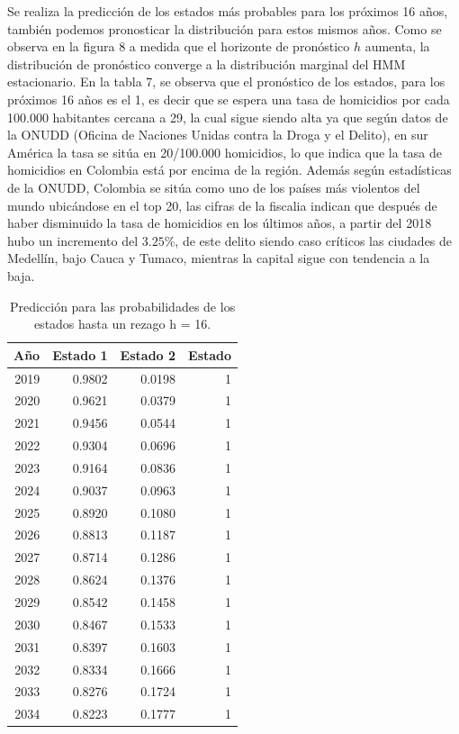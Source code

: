 \documentclass[a4paper]{article}\usepackage[]{graphicx}\usepackage[]{color}
\begin{document}
Se realiza la predicción de los estados más probables para los próximos 16 años, también podemos pronosticar la distribución para estos mismos años. Como se observa en la figura 8 a medida que el horizonte de pronóstico $h$ aumenta, la distribución de pronóstico converge a la distribución marginal del HMM estacionario. En la tabla 7, se observa que el pronóstico de los estados, para los próximos 16 años es el 1, es decir que se espera una tasa de homicidios por cada 100.000 habitantes cercana a 29, la cual sigue siendo alta ya que según datos de la ONUDD (Oficina de Naciones Unidas contra la Droga y el Delito), en sur América la tasa se sitúa en 20/100.000 homicidios, lo que indica que la tasa de homicidios en  Colombia está por encima de la región. Además según estadísticas de la ONUDD, Colombia se sitúa como uno de los países más violentos del mundo ubicándose en el top 20, las cifras de la fiscalia indican que después de haber disminuido la tasa de homicidios en los últimos años, a partir del 2018 hubo un incremento del $3.25 \%$, de este delito siendo caso críticos las ciudades de Medellín, bajo Cauca y Tumaco, mientras la capital sigue con tendencia a la baja.

\begin{table}[ht]
\centering
\begin{tabular}{rrrr}
  \hline
Año & Estado 1 & Estado 2 & Estado \\ 
  \hline
 2019 & 0.9802 & 0.0198 &     1 \\ 
   2020 & 0.9621 & 0.0379 &     1 \\ 
   2021 & 0.9456 & 0.0544 &     1 \\ 
   2022 & 0.9304 & 0.0696 &     1 \\ 
   2023 & 0.9164 & 0.0836 &     1 \\ 
   2024 & 0.9037 & 0.0963 &     1 \\ 
   2025 & 0.8920 & 0.1080 &     1 \\ 
   2026 & 0.8813 & 0.1187 &     1 \\ 
   2027 & 0.8714 & 0.1286 &     1 \\ 
   2028 & 0.8624 & 0.1376 &     1 \\ 
   2029 & 0.8542 & 0.1458 &     1 \\ 
   2030 & 0.8467 & 0.1533 &     1 \\ 
   2031 & 0.8397 & 0.1603 &     1 \\ 
   2032 & 0.8334 & 0.1666 &     1 \\ 
   2033 & 0.8276 & 0.1724 &     1 \\ 
   2034 & 0.8223 & 0.1777 &     1 \\ 
   \hline
\end{tabular}
\caption{Predicción para las probabilidades de los estados hasta un rezago h = 16.} 
\end{table}
\end{document}
